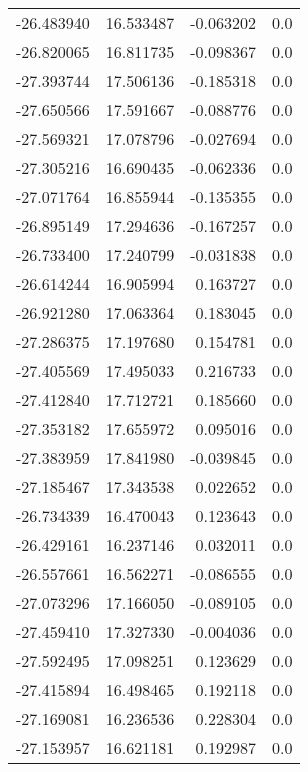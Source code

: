 \begin{tabular}{rrrr}
      -26.483940 &        16.533487 &   -0.063202 &   0.0 \\
      -26.820065 &        16.811735 &   -0.098367 &   0.0 \\
      -27.393744 &        17.506136 &   -0.185318 &   0.0 \\
      -27.650566 &        17.591667 &   -0.088776 &   0.0 \\
      -27.569321 &        17.078796 &   -0.027694 &   0.0 \\
      -27.305216 &        16.690435 &   -0.062336 &   0.0 \\
      -27.071764 &        16.855944 &   -0.135355 &   0.0 \\
      -26.895149 &        17.294636 &   -0.167257 &   0.0 \\
      -26.733400 &        17.240799 &   -0.031838 &   0.0 \\
      -26.614244 &        16.905994 &    0.163727 &   0.0 \\
      -26.921280 &        17.063364 &    0.183045 &   0.0 \\
      -27.286375 &        17.197680 &    0.154781 &   0.0 \\
      -27.405569 &        17.495033 &    0.216733 &   0.0 \\
      -27.412840 &        17.712721 &    0.185660 &   0.0 \\
      -27.353182 &        17.655972 &    0.095016 &   0.0 \\
      -27.383959 &        17.841980 &   -0.039845 &   0.0 \\
      -27.185467 &        17.343538 &    0.022652 &   0.0 \\
      -26.734339 &        16.470043 &    0.123643 &   0.0 \\
      -26.429161 &        16.237146 &    0.032011 &   0.0 \\
      -26.557661 &        16.562271 &   -0.086555 &   0.0 \\
      -27.073296 &        17.166050 &   -0.089105 &   0.0 \\
      -27.459410 &        17.327330 &   -0.004036 &   0.0 \\
      -27.592495 &        17.098251 &    0.123629 &   0.0 \\
      -27.415894 &        16.498465 &    0.192118 &   0.0 \\
      -27.169081 &        16.236536 &    0.228304 &   0.0 \\
      -27.153957 &        16.621181 &    0.192987 &   0.0 \\

\end{tabular}
